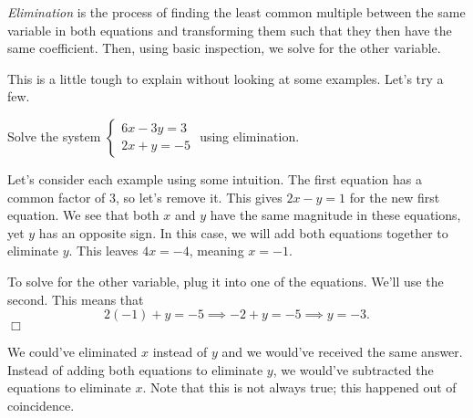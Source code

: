 \documentclass[../book.tex]{subfiles}
\begin{document}
\textit{Elimination} is the process of finding the least common multiple between the same variable in both equations and transforming them such that they then have the same coefficient.  Then, using basic inspection, we solve for the other variable.

This is a little tough to explain without looking at some examples.  Let's try a few.
\begin{example}
Solve the system $\begin{cases} 6x-3y=3 \\ 2x+y=-5 \end{cases}$ using elimination.
\end{example}
\begin{solution}
Let's consider each example using some intuition.  The first equation has a common factor of $3$, so let's remove it.  This gives $2x-y=1$ for the new first equation.  We see that both $x$ and $y$ have the same magnitude in these equations, yet $y$ has an opposite sign.  In this case, we will add both equations together to eliminate $y$.  This leaves $4x=-4$, meaning $x=-1$.

To solve for the other variable, plug it into one of the equations.  We'll use the second.  This means that $$2(-1)+y=-5 \implies -2+y=-5 \implies y=-3.$$ $\Box$
\end{solution}

\begin{remark}
We could've eliminated $x$ instead of $y$ and we would've received the same answer.  Instead of adding both equations to eliminate $y$, we would've subtracted the equations to eliminate $x$.  Note that this is not always true; this happened out of coincidence.  
\end{remark}
\end{document}
